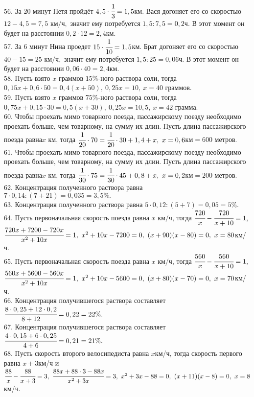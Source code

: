56. За 20 минут Петя пройдёт $4,5\cdot\cfrac{1}{3}=1,5$км. Вася догоняет его со скоростью $12-4,5=7,5\text{ км/ч},$ значит ему потребуется $1,5:7,5=0,2$ч. В этот момент он будет на расстоянии $0,2\cdot12=2,4$км.\\
57. За 6 минут Нина проедет $15\cdot\cfrac{1}{10}=1,5$км. Брат догоняет его со скоростью $40-15=25\text{ км/ч},$ значит ему потребуется $1,5:25=0,06$ч. В этот момент он будет на расстоянии $0,06\cdot40=2,4$км.\\
58. Пусть взято $x$ граммов $15\%$-ного раствора соли, тогда $0,15x+0,6\cdot50=0,4(x+50),\ 0,25x=10,\ x=40$ граммов.\\
59. Пусть взято $x$ граммов $75\%$-ного раствора соли, тогда $0,75x+0,15\cdot30=0,5(x+30),\ 0,25x=10,5,\ x=42$ грамма.\\
60. Чтобы проехать мимо товарного поезда, пассажирскому поезду необходимо проехать больше, чем товарному, на сумму их длин. Пусть длина пассажирского поезда равна$x$ км, тогда $\cfrac{1}{20}\cdot70=\cfrac{1}{20}\cdot30+1,4+x,\ x=0,6$км$=600$ метров.\\
61. Чтобы проехать мимо товарного поезда, пассажирскому поезду необходимо проехать больше, чем товарному, на сумму их длин. Пусть длина пассажирского поезда равна$x$ км, тогда $\cfrac{1}{30}\cdot75=\cfrac{1}{30}\cdot45+0,8+x,\ x=0,2$км$=200$ метров.\\
62. Концентрация полученного раствора равна $7\cdot0,14:(7+21)=0,035=3,5\%.$\\
63. Концентрация полученного раствора равна $5\cdot0,12:(5+7)=0,05=5\%.$\\
64. Пусть первоначальная скорость поезда равна $x$ км/ч, тогда $\cfrac{720}{x}-\cfrac{720}{x+10}=1,$\\$ \cfrac{720x+7200-720x}{x^2+10x}=1,\ x^2+10x-7200=0,\
(x+90)(x-80)=0,\ x=80$км/ч.\\
65. Пусть первоначальная скорость поезда равна $x$ км/ч, тогда $\cfrac{560}{x}-\cfrac{560}{x+10}=1,$\\$ \cfrac{560x+5600-560x}{x^2+10x}=1,\ x^2+10x-5600=0,\
(x+80)(x-70)=0,\ x=70$км/ч.\\
66. Концентрация получившегося раствора составляет $\cfrac{8\cdot0,25+12\cdot0,2}{8+12}=0,22=22\%.$\\
67. Концентрация получившегося раствора составляет $\cfrac{4\cdot0,15+6\cdot0,25}{4+6}=0,21=21\%.$\\
68. Пусть скорость второго велосипедиста равна $x$км/ч, тогда скорость первого равна $x+3$км/ч и $\cfrac{88}{x}-\cfrac{88}{x+3}=3,\ \cfrac{88x+88\cdot3-88x}{x^2+3x}=3,\ x^2+3x-88=0,\ (x+11)(x-8)=0,\ x=8$км/ч.\\
